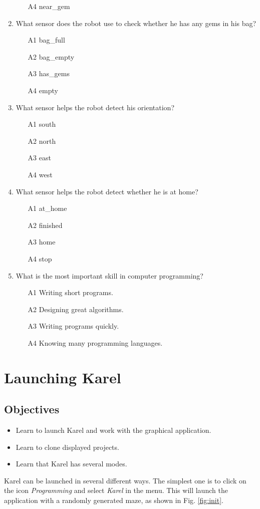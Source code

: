 \documentclass[article,A4,12pt]{llncs}
\begin{document}
\begin{enumerate}
\begin{enumerate}
\item[A4] near\_gem
\end{enumerate}
\item What sensor does the robot use to check whether he has any gems in his bag?
\begin{enumerate}
\item[A1] bag\_full
\item[A2] bag\_empty
\item[A3] has\_gems
\item[A4] empty
\end{enumerate}
\item What sensor helps the robot detect his orientation?
\begin{enumerate}
\item[A1] south
\item[A2] north
\item[A3] east
\item[A4] west
\end{enumerate}
\item What sensor helps the robot detect whether he is at home?
\begin{enumerate}
\item[A1] at\_home
\item[A2] finished
\item[A3] home
\item[A4] stop
\end{enumerate}
\item What is the most important skill in computer programming?
\begin{enumerate}
\item[A1] Writing short programs.
\item[A2] Designing great algorithms.
\item[A3] Writing programs quickly.
\item[A4] Knowing many programming languages.
\end{enumerate}
\end{enumerate}

\section{Launching Karel}

\subsection{Objectives} 
\begin{itemize}
\item Learn to launch Karel and work with the graphical application.
\item Learn to clone displayed projects.
\item Learn that Karel has several modes.
\end{itemize}
Karel can be launched in several different ways. The simplest one is to click on the icon 
{\em Programming} and select {\em Karel} in the menu. This will launch the application 
with a randomly generated maze, as shown in Fig. \ref{fig:init}.
\newpage
\end{document}
